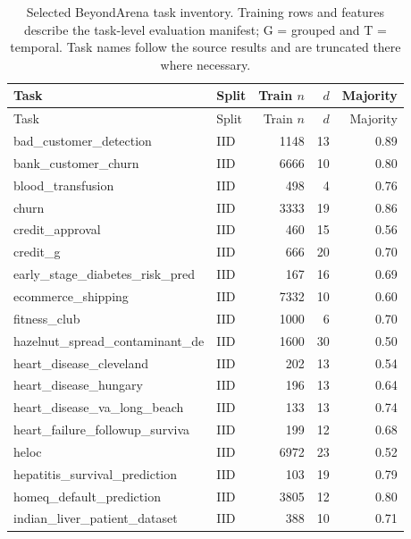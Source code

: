 \begin{longtable}{@{}p{6.3cm}lrrr@{}}
\caption{Selected BeyondArena task inventory. Training rows and features describe the task-level evaluation manifest; G = grouped and T = temporal. Task names follow the source results and are truncated there where necessary.}\label{tab:inventory}\\
\toprule Task & Split & Train $n$ & $d$ & Majority\\\midrule\endfirsthead
\toprule Task & Split & Train $n$ & $d$ & Majority\\\midrule\endhead
\bottomrule\endfoot
bad\_\allowbreak{}customer\_\allowbreak{}detection & IID & 1148 & 13 & 0.89\\
bank\_\allowbreak{}customer\_\allowbreak{}churn & IID & 6666 & 10 & 0.80\\
blood\_\allowbreak{}transfusion & IID & 498 & 4 & 0.76\\
churn & IID & 3333 & 19 & 0.86\\
credit\_\allowbreak{}approval & IID & 460 & 15 & 0.56\\
credit\_\allowbreak{}g & IID & 666 & 20 & 0.70\\
early\_\allowbreak{}stage\_\allowbreak{}diabetes\_\allowbreak{}risk\_\allowbreak{}pred & IID & 167 & 16 & 0.69\\
ecommerce\_\allowbreak{}shipping & IID & 7332 & 10 & 0.60\\
fitness\_\allowbreak{}club & IID & 1000 & 6 & 0.70\\
hazelnut\_\allowbreak{}spread\_\allowbreak{}contaminant\_\allowbreak{}de & IID & 1600 & 30 & 0.50\\
heart\_\allowbreak{}disease\_\allowbreak{}cleveland & IID & 202 & 13 & 0.54\\
heart\_\allowbreak{}disease\_\allowbreak{}hungary & IID & 196 & 13 & 0.64\\
heart\_\allowbreak{}disease\_\allowbreak{}va\_\allowbreak{}long\_\allowbreak{}beach & IID & 133 & 13 & 0.74\\
heart\_\allowbreak{}failure\_\allowbreak{}followup\_\allowbreak{}surviva & IID & 199 & 12 & 0.68\\
heloc & IID & 6972 & 23 & 0.52\\
hepatitis\_\allowbreak{}survival\_\allowbreak{}prediction & IID & 103 & 19 & 0.79\\
homeq\_\allowbreak{}default\_\allowbreak{}prediction & IID & 3805 & 12 & 0.80\\
indian\_\allowbreak{}liver\_\allowbreak{}patient\_\allowbreak{}dataset & IID & 388 & 10 & 0.71\\

\end{longtable}
